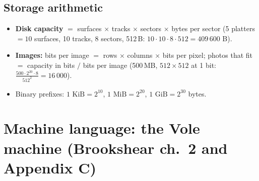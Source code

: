 \documentclass{fkt-notes}
\begin{document}
\subsection{Storage arithmetic}
\begin{itemize}[nosep]
  \item \textbf{Disk capacity} $=$ surfaces $\times$ tracks $\times$ sectors $\times$ bytes per sector
        (5 platters $=10$ surfaces, 10 tracks, 8 sectors, 512\,B: $10\cdot10\cdot8\cdot512=409\,600$ B).
  \item \textbf{Images:} bits per image $=$ rows $\times$ columns $\times$ bits per pixel;
        photos that fit $=$ capacity in bits $/$ bits per image (500\,MB, $512\times512$ at
        1 bit: $\frac{500\cdot2^{20}\cdot8}{512^2}=16\,000$).
  \item Binary prefixes: $1\text{ KiB}=2^{10}$, $1\text{ MiB}=2^{20}$, $1\text{ GiB}=2^{30}$ bytes.
\end{itemize}

\newpage
\section{Machine language: the Vole machine (Brookshear ch.~2 and Appendix C)}
\end{document}
